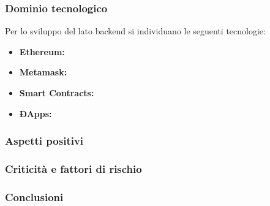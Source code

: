 \subsubsection{Dominio tecnologico}
Per lo sviluppo del lato backend si individuano le seguenti tecnologie:
\begin{itemize}
	\item \textbf{Ethereum:}
	\item \textbf{Metamask:}
	\item \textbf{Smart Contracts:}
	\item \textbf{ÐApps:}
\end{itemize}

\subsubsection{Aspetti positivi}

\subsubsection{Criticità e fattori di rischio}

\subsubsection{Conclusioni}
